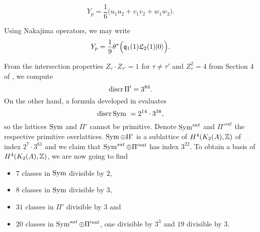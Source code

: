 \begin{corollary}\label{Classuvw}
\begin{equation} \label{YSym}
Y_p =  \frac{1}{6}\Big(u_1u_2 + v_1v_2 +  w_1 w_2 \Big).
\end{equation}
\end{corollary}
\begin{remark}
Using Nakajima operators, we may write
\begin{gather}
Y_p = \frac{1}{9} \theta^*\Big( \mathfrak{q}_1(1)\mathfrak L_2(1) |0\rangle \Big).
\end{gather}

\end{remark}

From the intersection properties $Z_\tau \cdot Z_{\tau'} = 1$ for $\tau\neq \tau'$ and $Z_\tau^2 = 4$ from Section 4 of \cite{Hassett}, we compute
\begin{equation}
 \operatorname{discr} \Pi' = 3^{84}.
 \label{discrPi}
\end{equation}
On the other hand, a formula developed in \cite{Kapfer} evaluates
\begin{equation} \label{DiscrSym}
\operatorname{discr} \operatorname{Sym} \ = 2^{14}\cdot 3^{38},
\end{equation}
so the lattices $\operatorname{Sym}$ and $\Pi'$ cannot be primitive. Denote $\operatorname{Sym}^{sat}$ and $\Pi'^{sat}$ the respective primitive overlattices. $\operatorname{Sym} \oplus\Pi'$ is a sublattice of $H^4(K_{ 2 }( A ),\mathbb{Z})$ of index $2^{7}\cdot 3^{61}$ and we claim that $\operatorname{Sym}^{sat}\oplus \Pi'^{sat}$ has index $3^{22}$. To obtain a basis of $H^4(K_{ 2 }( A ),\mathbb{Z})$, we are now going to find
\begin{itemize}
 \item $7$ classes in $\operatorname{Sym}$ divisible by $2$,
 \item $8$ classes in $\operatorname{Sym}$ divisible by $3$,
 \item $31$ classes in $\Pi'$ divisible by $3$ and
 \item $20$ classes in $\operatorname{Sym}^{sat}\oplus \Pi'^{sat}$, one divisible by $3^3$ and $19$ divisible by $3$.
\end{itemize}

